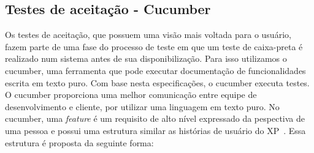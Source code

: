 \subsection{Testes de aceitação - Cucumber}
Os testes de aceitação, que possuem uma visão mais voltada para o usuário, fazem 
parte de uma fase do processo de teste em que um teste de caixa-preta é realizado 
num sistema antes de sua disponibilização. Para isso utilizamos o cucumber, uma 
ferramenta que pode executar documentação de funcionalidades escrita em texto puro. 
Com base nesta especificações, o cucumber executa testes. O cucumber proporciona uma melhor comunicação entre equipe de desenvolvimento e cliente, por utilizar uma linguagem  em texto puro.
%
No cucumber, uma \textit{feature} é um requisito de alto nível 
expressado da pespectiva de uma pessoa e possui uma estrutura similar as histórias 
de usuário do XP~. Essa estrutura é proposta da seguinte forma:
